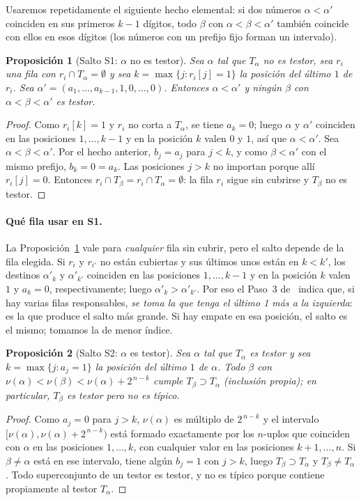 \documentclass[11pt, a4paper]{article}
\theoremstyle{definition}
\theoremstyle{plain}
\newtheorem{proposicion}{Proposición}
\begin{document}
Usaremos repetidamente el siguiente hecho elemental: si dos números $\alpha<\alpha'$
coinciden en sus primeros $k-1$ dígitos, todo $\beta$ con $\alpha<\beta<\alpha'$ también
coincide con ellos en esos dígitos (los números con un prefijo fijo forman un
intervalo).

\begin{proposicion}[Salto S1: $\alpha$ no es testor]\label{prop:s1}
Sea $\alpha$ tal que $T_\alpha$ no es testor, sea $r_i$ una fila con
$r_i\cap T_\alpha=\emptyset$ y sea $k=\max\{j: r_i[j]=1\}$ la posición del
\emph{último} $1$ de $r_i$. Sea
$\alpha'=(a_1,\dots,a_{k-1},1,0,\dots,0)$. Entonces $\alpha<\alpha'$ y ningún
$\beta$ con $\alpha<\beta<\alpha'$ es testor.
\end{proposicion}
\begin{proof}
Como $r_i[k]=1$ y $r_i$ no corta a $T_\alpha$, se tiene $a_k=0$; luego $\alpha$ y
$\alpha'$ coinciden en las posiciones $1,\dots,k-1$ y en la posición $k$ valen $0$
y $1$, así que $\alpha<\alpha'$. Sea $\alpha<\beta<\alpha'$. Por el hecho anterior,
$b_j=a_j$ para $j<k$, y como $\beta<\alpha'$ con el mismo prefijo, $b_k=0=a_k$. Las
posiciones $j>k$ no importan porque allí $r_i[j]=0$. Entonces
$r_i\cap T_\beta=r_i\cap T_\alpha=\emptyset$: la fila $r_i$ sigue sin cubrirse y
$T_\beta$ no es testor.
\end{proof}

\paragraph{Qué fila usar en S1.} La Proposición~\ref{prop:s1} vale para
\emph{cualquier} fila sin cubrir, pero el salto depende de la fila elegida. Si
$r_i$ y $r_{i'}$ no están cubiertas y sus últimos unos están en $k<k'$, los
destinos $\alpha'_k$ y $\alpha'_{k'}$ coinciden en las posiciones $1,\dots,k-1$ y
en la posición $k$ valen $1$ y $a_k=0$, respectivamente; luego
$\alpha'_k>\alpha'_{k'}$. Por eso el Paso~3 de~\cite{algobt} indica que, si hay
varias filas responsables, \emph{se toma la que tenga el último 1 más a la
izquierda}: es la que produce el salto más grande. Si hay empate en esa
posición, el salto es el mismo; tomamos la de menor índice.

\begin{proposicion}[Salto S2: $\alpha$ es testor]\label{prop:s2}
Sea $\alpha$ tal que $T_\alpha$ es testor y sea $k=\max\{j: a_j=1\}$ la posición del
último $1$ de $\alpha$. Todo $\beta$ con $\nu(\alpha)<\nu(\beta)<\nu(\alpha)+2^{\,n-k}$
cumple $T_\beta\supset T_\alpha$ (inclusión propia); en particular, $T_\beta$ es testor pero
\emph{no} es típico.
\end{proposicion}
\begin{proof}
Como $a_j=0$ para $j>k$, $\nu(\alpha)$ es múltiplo de $2^{\,n-k}$ y el intervalo
$[\nu(\alpha),\nu(\alpha)+2^{\,n-k})$ está formado exactamente por los $n$-uplos que
coinciden con $\alpha$ en las posiciones $1,\dots,k$, con cualquier valor en las
posiciones $k+1,\dots,n$. Si $\beta\neq\alpha$ está en ese intervalo, tiene algún
$b_j=1$ con $j>k$, luego $T_\beta\supset T_\alpha$ y $T_\beta\neq T_\alpha$. Todo superconjunto de un testor
es testor, y no es típico porque contiene propiamente al testor $T_\alpha$.
\end{proof}
\end{document}
